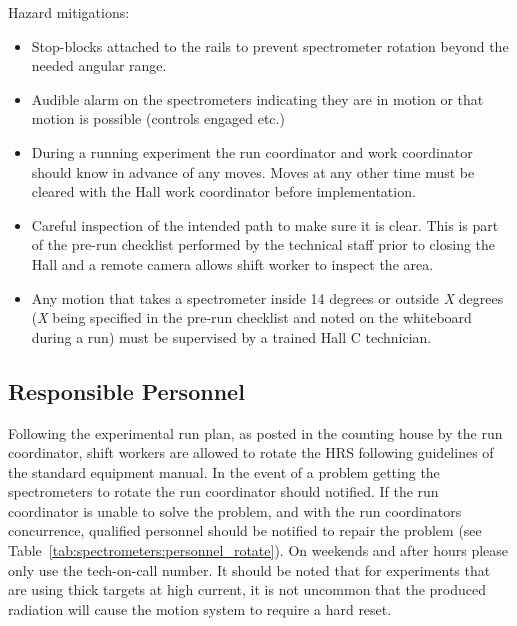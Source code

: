 {\begin{safetyen}{0}{0}
Hazard mitigations:
\begin{itemize}
\item{Stop-blocks attached to the rails to prevent spectrometer rotation beyond the needed angular range.}
\item{Audible alarm on the spectrometers indicating they are in motion or that motion
is possible (controls engaged etc.)}
\item{During a running experiment the run coordinator and work coordinator should know in advance 
of any moves.  Moves at any other time must be cleared with the Hall work coordinator 
before implementation.}
\item{Careful inspection of the intended path to make sure it is clear. This is part of
the pre-run checklist performed by the technical staff prior to closing the Hall and
a remote camera allows shift worker to inspect the area.}
\item{Any motion that takes a spectrometer inside 14 degrees or outside \emph{X} degrees
(\emph{X} being specified in the pre-run checklist and noted on the whiteboard during a run) 
must be supervised by a trained Hall C technician.}
\end{itemize}
\end{safetyen}

\subsection{Responsible Personnel}

Following the experimental run plan, as posted in the counting house
by the run coordinator, shift workers are allowed to rotate the HRS
following guidelines of the standard equipment manual.  In the event
of a problem getting the spectrometers to rotate the run coordinator
should notified.  If the run coordinator is unable to solve the
problem, and with the run coordinators concurrence, qualified
personnel should be notified to repair the problem (see
Table~\ref{tab:spectrometers:personnel_rotate}).  On weekends and after hours
please only use the tech-on-call number.  It should be noted that for
experiments that are using thick targets at high current, it is not
uncommon that the produced radiation will cause the motion system to
require a hard reset.



}
